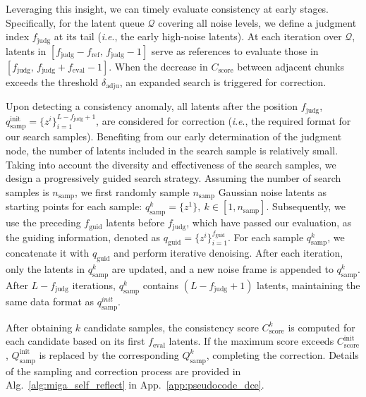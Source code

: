 \documentclass{article}
\theoremstyle{plain}
\theoremstyle{definition}
\theoremstyle{remark}
\newcommand{\ie}{\textit{i}.\textit{e}.}
\begin{document}
Leveraging this insight, we can timely evaluate consistency at early stages. Specifically, for the latent queue $\mathcal{Q}$ covering all noise levels, we define a judgment index $f_\mathrm{judg}$ at its tail (\ie, the early high-noise latents). At each iteration over $\mathcal{Q}$, latents in $[f_\mathrm{judg} - f_\mathrm{ref},\, f_\mathrm{judg} - 1]$ serve as references to evaluate those in $[f_\mathrm{judg},\, f_\mathrm{judg} + f_\mathrm{eval} - 1]$. 
When the decrease in $C_\mathrm{score}$ between adjacent chunks exceeds the threshold $\delta_{\mathrm{adju}}$, an expanded search is triggered for correction.

Upon detecting a consistency anomaly, all latents after the position $f_\mathrm{judg}$,  $q^{\mathrm{init}}_{\mathrm{samp}} = \{z^i\}_{i=1}^{L-f_\mathrm{judg}+1}$, are considered for correction (\ie, the required format for our search samples).
Benefiting from our early determination of the judgment node, the number of latents included in the search sample is relatively small.
Taking into account the diversity and effectiveness of the search samples, we design a progressively guided search strategy. 
Assuming the number of search samples is $n_\mathrm{samp}$, we first randomly sample $n_\mathrm{samp}$ Gaussian noise latents as starting points for each sample:
$q^{k}_{\mathrm{samp}} = \{z^{1}\},\ k \in [1, n_\mathrm{samp}]$.
Subsequently, we use the preceding $f_\mathrm{guid}$ latents before $f_\mathrm{judg}$, which have passed our evaluation, as the guiding information, denoted as $q_{\mathrm{guid}} = \{z^{i}\}_{i=1}^{f_\mathrm{guid}}$.
For each sample $q^{k}_{\mathrm{samp}}$, we concatenate it with $q_{\mathrm{guid}}$ and perform iterative denoising. 
After each iteration, only the latents in $q^{k}_{\mathrm{samp}}$ are updated, and a new noise frame is appended to $q^{k}_{\mathrm{samp}}$. 
After $L-f_\mathrm{judg}$ iterations, $q^{k}_{\mathrm{samp}}$ contains $(L-f_\mathrm{judg}+1)$ latents, 
maintaining the same data format as $q^{init}_{\mathrm{samp}}$.


After obtaining $k$ candidate samples, the consistency score $C_{\mathrm{score}}^{k}$ is computed for each candidate based on its first $f_{\mathrm{eval}}$ latents. 
If the maximum score exceeds $C_{\mathrm{score}}^{\mathrm{init}}$, $Q_{\mathrm{samp}}^{\mathrm{init}}$ is replaced by the corresponding $Q_{\mathrm{samp}}^{k}$, completing the correction. 
Details of the sampling and correction process are provided in Alg.~\ref{alg:miga_self_reflect} in App.~\ref{app:pseudocode_dce}.
\end{document}

